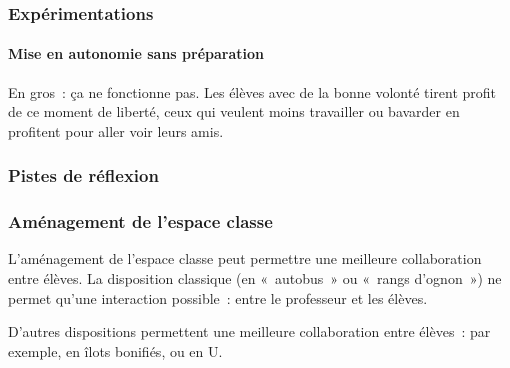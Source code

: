 \subsubsection{Expérimentations}

\paragraph{Mise en autonomie sans préparation}

En gros : ça ne fonctionne pas. Les élèves avec de la bonne volonté tirent profit
de ce moment de liberté, ceux qui veulent moins travailler ou bavarder en profitent
pour aller voir leurs amis.

\subsubsection{Pistes de réflexion}

\subsubsection{Aménagement de l'espace classe}

L'aménagement de l'espace classe peut permettre une meilleure collaboration entre
élèves. La disposition classique (en « autobus » ou « rangs d'ognon ») ne permet
qu'une interaction possible : entre le professeur et les élèves.

D'autres dispositions permettent une meilleure collaboration entre élèves : par
exemple, en îlots bonifiés\cite{ilots_bonifies}, ou en U\cite{amenagement_classe}.
